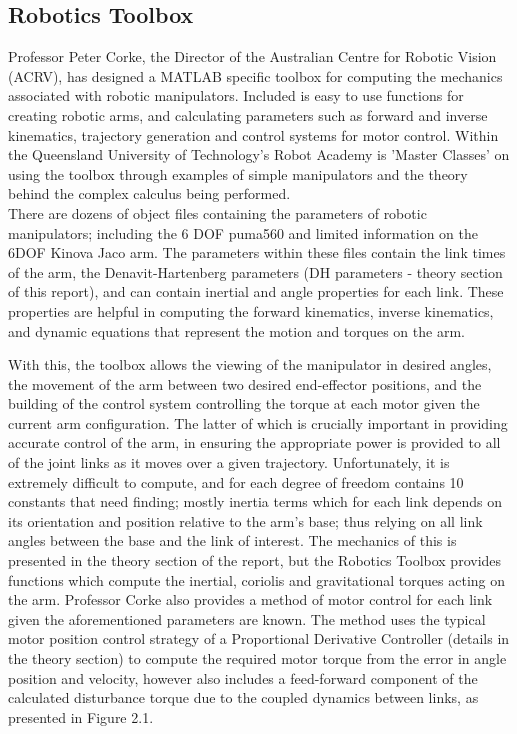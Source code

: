\documentclass[12pt,openany,a4paper]{book}
\begin{document}
\subsection{Robotics Toolbox}
Professor Peter Corke, the Director of the Australian Centre for Robotic Vision (ACRV), has designed a MATLAB specific toolbox for computing the mechanics associated with robotic manipulators. Included is easy to use functions for creating robotic arms, and calculating parameters such as forward and inverse kinematics, trajectory generation and control systems for motor control. Within the Queensland University of Technology's Robot Academy is 'Master Classes' on using the toolbox through examples of simple manipulators and the theory behind the complex calculus being performed.\\

There are dozens of object files containing the parameters of robotic manipulators; including the 6 DOF puma560 and limited information on the 6DOF Kinova Jaco arm. The parameters within these files contain the link times of the arm, the Denavit-Hartenberg parameters (DH parameters - theory section of this report), and can contain inertial and angle properties for each link. These properties are helpful in computing the forward kinematics, inverse kinematics, and dynamic equations that represent the motion and torques on the arm.

With this, the toolbox allows the viewing of the manipulator in desired angles, the movement of the arm between two desired end-effector positions, and the building of the control system controlling the torque at each motor given the current arm configuration. The latter of which is crucially important in providing accurate control of the arm, in ensuring the appropriate power is provided to all of the joint links as it moves over a given trajectory. Unfortunately, it is extremely difficult to compute, and for each degree of freedom contains 10 constants that need finding; mostly inertia terms which for each link depends on its orientation and position relative to the arm's base; thus relying on all link angles between the base and the link of interest. The mechanics of this is presented in the theory section of the report, but the Robotics Toolbox provides functions which compute the inertial, coriolis and gravitational torques acting on the arm. Professor Corke also provides a method of motor control for each link given the aforementioned parameters are known. The method uses the typical motor position control strategy of a Proportional Derivative Controller (details in the theory section) to compute the required motor torque from the error in angle position and velocity, however also includes a feed-forward component of the calculated disturbance torque due to the coupled dynamics between links, as presented in Figure 2.1. 
\end{document}

